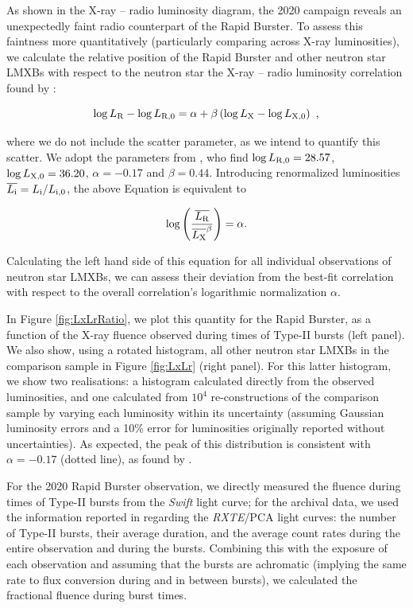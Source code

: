 \documentclass[fleqn,usenatbib]{mnras}
\begin{document}
As shown in the X-ray -- radio luminosity diagram, the 2020 campaign reveals an unexpectedly faint radio counterpart of the Rapid Burster. To assess this faintness more quantitatively (particularly comparing across X-ray luminosities), we calculate the relative position of the Rapid Burster and other neutron star LMXBs with respect to the neutron star the X-ray -- radio luminosity correlation found by \citet{gallo18}:

\begin{equation}
\log L_{\rm R} -  \log L_{\rm R,0} = \alpha + \beta \left(\log L_{\rm X} - \log L_{\rm X,0}\right)  \text{ ,}
\end{equation}

\noindent where we do not include the scatter parameter, as we intend to quantify this scatter. We adopt the parameters from \citet{gallo18}, who find $\log L_{\rm R,0} = 28.57$, $\log L_{\rm X,0} = 36.20$, $\alpha=-0.17$ and $\beta=0.44$. Introducing renormalized luminosities $\overline{L_{\rm i}} = L_{\rm i}/ L_{\rm i,0}$, the above Equation is equivalent to

\begin{equation}
\log \left(\frac{\overline{L_{\rm R}}}{\overline{L_{\rm X}}^{\beta}}\right) = \alpha \text{.}
\end{equation}

\noindent Calculating the left hand side of this equation for all individual observations of neutron star LMXBs, we can assess their deviation from the best-fit correlation with respect to the overall correlation’s logarithmic normalization $\alpha$. 

In Figure \ref{fig:LxLrRatio}, we plot this quantity for the Rapid Burster, as a function of the X-ray fluence observed during times of Type-II bursts (left panel). We also show, using a rotated histogram, all other neutron star LMXBs in the comparison sample in Figure \ref{fig:LxLr} (right panel). For this latter histogram, we show two realisations: a histogram calculated directly from the observed luminosities, and one calculated from $10^4$ re-constructions of the comparison sample by varying each luminosity within its uncertainty (assuming Gaussian luminosity errors and a 10\% error for luminosities originally reported without uncertainties). As expected, the peak of this distribution is consistent with $\alpha = -0.17$ (dotted line), as found by \citet{gallo18}. 

For the 2020 Rapid Burster observation, we directly measured the fluence during times of Type-II bursts from the \textit{Swift} light curve; for the archival data, we used the information reported in \citet{moore2000} regarding the \textit{RXTE}/PCA light curves: the number of Type-II bursts, their average duration, and the average count rates during the entire observation and during the bursts. Combining this with the exposure of each observation and assuming that the bursts are achromatic (implying the same rate to flux conversion during and in between bursts), we calculated the fractional fluence during burst times. 
\end{document}
